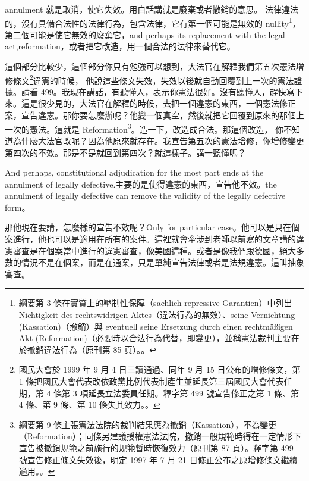 \hypertarget{w05:cue:141}{}annulment 就是取消，使它失效。用白話講就是廢棄或者撤銷的意思。
\hypertarget{w05:cue:142}{}法律違法的，沒有具備合法性的法律行為，包含法律，它有第一個可能是無效的 nullity\footnote{綱要第 3 條在實質上的壓制性保障（sachlich-repressive Garantien）中列出 Nichtigkeit des rechtswidrigen Aktes（違法行為的無效）、seine Vernichtung (Kassation)（撤銷）與 eventuell seine Ersetzung durch einen rechtmäßigen Akt (Reformation)（必要時以合法行為代替，即變更），並稱憲法裁判主要在於撤銷違法行為（原刊第 85 頁）。\cite[85]{kelsen1929}。}，第二個可能是使它無效的廢棄它，and perhaps its replacement with the legal act,reformation，或者把它改造，用一個合法的法律來替代它。

\hypertarget{w05:cue:143}{}這個部分比較少，這個部分你只有勉強可以想到，大法官在解釋我們第五次憲法增修條文\footnote{國民大會於 1999 年 9 月 4 日三讀通過、同年 9 月 15 日公布的增修條文，第 1 條把國民大會代表改依政黨比例代表制產生並延長第三屆國民大會代表任期，第 4 條第 3 項延長立法委員任期。釋字第 499 號宣告修正之第 1 條、第 4 條、第 9 條、第 10 條失其效力。\cite{jy499}。}違憲的時候，
\hypertarget{w05:cue:144}{}他說這些條文失效，失效以後就自動回覆到上一次的憲法證據。請看 499。我現在講話，有聽懂人，表示你憲法很好。沒有聽懂人，趕快寫下來。這是很少見的，大法官在解釋的時候，去把一個違憲的東西，一個憲法修正案，宣告違憲。那你要怎麼辦呢？他變一個真空，然後就把它回覆到原來的那個上一次的憲法。這就是 Reformation\footnote{綱要第 9 條主張憲法法院的裁判結果應為撤銷（Kassation），不為變更（Reformation）；同條另建議授權憲法法院，撤銷一般規範時得在一定情形下宣告被撤銷規範之前施行的規範暫時恢復效力（原刊第 87 頁）。釋字第 499 號宣告修正條文失效後，明定 1997 年 7 月 21 日修正公布之原增修條文繼續適用。\cite[87]{kelsen1929}。}。造一下，改造成合法。那這個改造，
\hypertarget{w05:cue:145}{}你不知道為什麼大法官改呢？因為他原來就存在。我宣告第五次的憲法增修，你增修變更第四次的不效。那是不是就回到第四次？就這樣子。講一聽懂嗎？

\hypertarget{w05:cue:146}{}And perhaps, constitutional adjudication for the most part ends at the annulment of legally defective.主要的是使得違憲的東西，宣告他不效。the annulment of legally defective can remove the validity of the legally defective form。

\hypertarget{w05:cue:147}{}那他現在要講，怎麼樣的宣告不效呢？Only for particular case。他可以是只在個案進行，他也可以是適用在所有的案件。這裡就會牽涉到老師以前寫的文章講的違憲審查是在個案當中進行的違憲審查，像美國這種。或者是像我們跟德國，絕大多數的情況不是在個案，而是在通案，只是單純宣告法律或者是法規違憲。這叫抽象審查。

